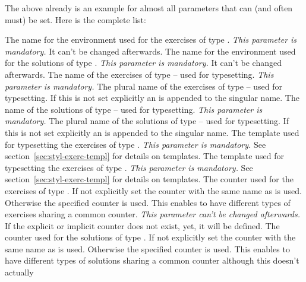 \documentclass{xsim-manual}
\begin{document}
The above already is an example for almost all parameters that can (and often
must) be set.  Here is the complete list:
\begin{parameters}
    The name for the environment used for the exercises of type .
    \emph{This parameter is mandatory.} It can't be changed afterwards.
    The name for the environment used for the solutions of type .
    \emph{This parameter is mandatory.} It can't be changed afterwards.
    The name of the exercises of type  -- used for typesetting.
    \emph{This parameter is mandatory.}
    The plural name of the exercises of type  --
    used for typesetting.  If this is not set explicitly an  is
    appended to the singular name.
    The name of the solutions of type  -- used for typesetting.
    \emph{This parameter is mandatory.}
    The plural name of the solutions of type  --
    used for typesetting.  If this is not set explicitly an  is
    appended to the singular name.
    The template used for typesetting the exercises of type .
    \emph{This parameter is mandatory.} See
    section~\vref{sec:styl-exerc-templ} for details on templates.
    The template used for typesetting the exercises of type .
    \emph{This parameter is mandatory.} See
    section~\vref{sec:styl-exerc-templ} for details on templates.
    The counter used for the exercises of type .  If not explicitly
    set the counter with the same name as  is used.
    Otherwise the specified counter is used.  This enables to have different
    types of exercises sharing a common counter.  \emph{This parameter can't
      be changed afterwards.}  If the explicit or implicit counter does not
    exist, yet, it will be defined.
    The counter used for the solutions of type .  If not explicitly
    set the counter with the same name as  is used.
    Otherwise the specified counter is used.  This enables to have different
    types of solutions sharing a common counter although this doesn't actually

\end{parameters}
\end{document}
